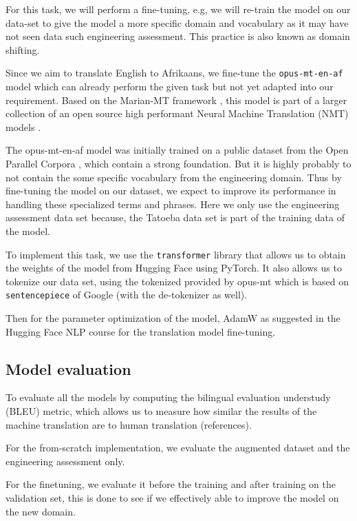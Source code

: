 For this task, we will perform a fine-tuning, e.g, we will re-train the model on our data-set to give the model a more specific domain and vocabulary as it may have not seen data such  engineering assessment. This practice is also known as domain shifting.

Since we aim to translate English to Afrikaans, we fine-tune the \texttt{opus-mt-en-af} model which can already perform the given task but not yet adapted into our requirement. Based on the Marian-MT framework \cite{marian}, this model is part of a larger collection of an open source high performant Neural Machine Translation (NMT) models \cite{OPUSMT}.

The opus-mt-en-af model was initially trained on a public dataset from the Open Parallel Corpora \cite{opus}, which contain a strong foundation. But it is highly probably to not contain the some specific vocabulary from the engineering domain. Thus by fine-tuning the model on our dataset, we expect to improve its performance in handling these specialized terms and phrases. Here we only use the engineering assessment data set because, the Tatoeba data set is part of the training data of the model.

To implement this task, we use the \texttt{transformer} library that allows us to obtain the weights of the model from Hugging Face \cite{huggingface} using PyTorch. It also allows us to tokenize our data set, using the tokenized provided by opus-mt which is based on \texttt{sentencepiece} \cite{sentencepiece} of Google (with the de-tokenizer as well).

Then for the parameter optimization of the model, AdamW  \cite{AdamW} as suggested in the Hugging Face NLP course for the translation model fine-tuning.

\subsection{Model evaluation}
To evaluate all the models by computing the bilingual evaluation understudy (BLEU) metric, which allows us to measure how similar the results of the machine translation are to human translation (references).

For the from-scratch implementation, we evaluate the augmented dataset and the engineering assessment only.

For the finetuning, we evaluate it before the training and after training on the validation set, this is done to see if we effectively able to improve the model on the new domain.




